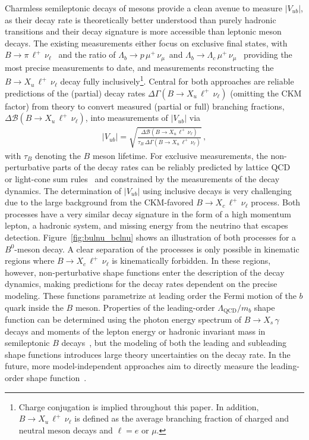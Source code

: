 \documentclass[twocolumn,aps,prd,superscriptaddress,nofootinbib,floatfix,preprintnumbers,a4]{revtex4-1}
\newcommand{\bulnu}{\ensuremath{B \to X_u \, \ell^+\, \nu_{\ell}}\xspace}
\newcommand{\bclnu}{\ensuremath{B \to X_c \, \ell^+\, \nu_{\ell}}\xspace}
\newcommand{\bpilnu}{\ensuremath{B \to \pi \, \ell^+\,\nu_{\ell}}\xspace}
\newcommand{\lbplnu}{\ensuremath{\Lambda_b \to p \, \mu^+ \, \nu_\mu}\xspace}
\newcommand{\lblclnu}{\ensuremath{\Lambda_b \to \Lambda_c \, \mu^+ \, \nu_\mu}\xspace}
\begin{document}
Charmless semileptonic decays of \PB mesons provide a clean avenue to measure $|V_{ub}|$, as their decay rate is theoretically better understood than purely hadronic transitions and their decay signature is more accessible than leptonic \PB meson decays. The existing measurements either focus on exclusive final states, with \bpilnu~\cite{Amhis:2019ckw} and the ratio of \lbplnu\ and \lblclnu~\cite{Aaij:2015bfa} providing the most precise measurements to date, and measurements reconstructing the \bulnu decay fully inclusively\footnote{Charge conjugation is implied throughout this paper. In addition, \bulnu is defined as the average branching fraction of charged and neutral \PB meson decays and $\ell = e$ or $\mu$.}. Central for both approaches are reliable predictions of the (partial) decay rates $\Delta \Gamma(\bulnu)$ (omitting the CKM factor) from theory to convert measured (partial or full) branching fractions, $\Delta \mathcal{B}(\bulnu)$, into measurements of $|V_{ub}|$ via
\begin{align}
 |V_{ub}| = \sqrt{ \frac{ \Delta \mathcal{B}(\bulnu) }{ \tau_B \, \Delta \Gamma(\bulnu) } } \, , \nonumber
\end{align}
with $\tau_B$ denoting the $B$ meson lifetime. For exclusive measurements, the non-perturbative parts of the decay rates can be reliably predicted by lattice QCD~\cite{Aoki:2019cca} or light-cone sum rules~\cite{Bharucha:2012wy} and constrained by the measurements of the decay dynamics. The determination of $|V_{ub}|$ using inclusive decays is very challenging due to the large background from the CKM-favored \bclnu process. Both processes have a very similar decay signature in the form of a high momentum lepton, a hadronic system, and missing energy from the neutrino that escapes detection. Figure~\ref{fig:bulnu_bclnu} shows an illustration of both processes for a $B^0$-meson decay. A clear separation of the processes is only possible in kinematic regions where \bclnu is kinematically forbidden. In these regions, however, non-perturbative shape functions enter the description of the decay dynamics, making predictions for the decay rates dependent on the precise modeling. These functions parametrize at leading order the Fermi motion of the $b$ quark inside the $B$ meson. Properties of the leading-order $\Lambda_{\mathrm{QCD}}/m_b$ shape function can be determined using the photon energy spectrum of $B \to X_s \, \gamma$ decays and moments of the lepton energy or hadronic invariant mass in semileptonic $B$ decays~\cite{Gambino:2004qm,Bauer:2004ve,Benson:2004sg}, but the modeling of both the leading and subleading shape functions introduces large theory uncertainties on the decay rate. 
In the future, more model-independent approaches aim to directly measure the leading-order shape function~\cite{Bernlochner:2020jlt,Gambino:2016fdy}.
\end{document}
